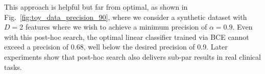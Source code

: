 This approach is helpful but far from optimal, as shown in Fig.~\ref{fig:toy_data_precision_90}, where we consider a synthetic dataset with $D=2$ features where we wish to achieve a minimum precision of $\alpha=0.9$.
Even with this post-hoc search, the optimal linear classifier trained via BCE cannot exceed a precision of 0.68, 
well below the desired precision of 0.9.
Later experiments show that post-hoc search also delivers sub-par results in real clinical tasks.



%    

